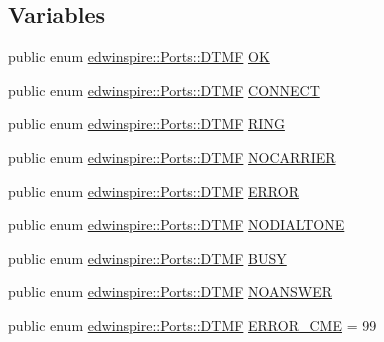 \subsection*{Variables}
\begin{DoxyCompactItemize}
\item 
public enum \hyperlink{namespaceedwinspire_1_1_ports_af4e0ec730b70610713b98825eb7c6f53}{edwinspire\-::\-Ports\-::\-D\-T\-M\-F} \hyperlink{namespaceedwinspire_1_1_ports_a1c098ccc8f7a4f8bd868fa4887872b4e}{O\-K}
\item 
public enum \hyperlink{namespaceedwinspire_1_1_ports_af4e0ec730b70610713b98825eb7c6f53}{edwinspire\-::\-Ports\-::\-D\-T\-M\-F} \hyperlink{namespaceedwinspire_1_1_ports_aff135858aa5a9cc89df1ab5c7be36d57}{C\-O\-N\-N\-E\-C\-T}
\item 
public enum \hyperlink{namespaceedwinspire_1_1_ports_af4e0ec730b70610713b98825eb7c6f53}{edwinspire\-::\-Ports\-::\-D\-T\-M\-F} \hyperlink{namespaceedwinspire_1_1_ports_a8de2369866bdfd3f0663a793d0e67255}{R\-I\-N\-G}
\item 
public enum \hyperlink{namespaceedwinspire_1_1_ports_af4e0ec730b70610713b98825eb7c6f53}{edwinspire\-::\-Ports\-::\-D\-T\-M\-F} \hyperlink{namespaceedwinspire_1_1_ports_ad4606903009920c6acc09144a51f91cf}{N\-O\-C\-A\-R\-R\-I\-E\-R}
\item 
public enum \hyperlink{namespaceedwinspire_1_1_ports_af4e0ec730b70610713b98825eb7c6f53}{edwinspire\-::\-Ports\-::\-D\-T\-M\-F} \hyperlink{namespaceedwinspire_1_1_ports_ab432ddd57eaa78866b8ce320fdb31d01}{E\-R\-R\-O\-R}
\item 
public enum \hyperlink{namespaceedwinspire_1_1_ports_af4e0ec730b70610713b98825eb7c6f53}{edwinspire\-::\-Ports\-::\-D\-T\-M\-F} \hyperlink{namespaceedwinspire_1_1_ports_aeeca1b6e1c383f62758a51f1307c8638}{N\-O\-D\-I\-A\-L\-T\-O\-N\-E}
\item 
public enum \hyperlink{namespaceedwinspire_1_1_ports_af4e0ec730b70610713b98825eb7c6f53}{edwinspire\-::\-Ports\-::\-D\-T\-M\-F} \hyperlink{namespaceedwinspire_1_1_ports_ab27d4ee5b5866641be5fde3f6c15719b}{B\-U\-S\-Y}
\item 
public enum \hyperlink{namespaceedwinspire_1_1_ports_af4e0ec730b70610713b98825eb7c6f53}{edwinspire\-::\-Ports\-::\-D\-T\-M\-F} \hyperlink{namespaceedwinspire_1_1_ports_a7b95c55cd0d61c0352039c017a0fe263}{N\-O\-A\-N\-S\-W\-E\-R}
\item 
public enum \hyperlink{namespaceedwinspire_1_1_ports_af4e0ec730b70610713b98825eb7c6f53}{edwinspire\-::\-Ports\-::\-D\-T\-M\-F} \hyperlink{namespaceedwinspire_1_1_ports_aa67849e33e71e0685dee31059d242ac3}{E\-R\-R\-O\-R\-\_\-\-C\-M\-E} = 99

\end{DoxyCompactItemize}
